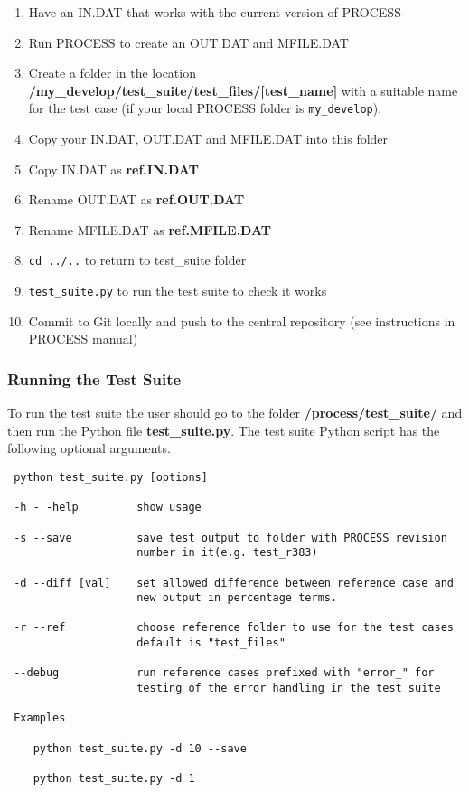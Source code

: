 \begin{enumerate}
  \item Have an IN.DAT that works with the current version of PROCESS
  \item Run PROCESS to create an OUT.DAT and MFILE.DAT
  \item Create a folder in the location \textbf{/my\_develop/test\_suite/test\_files/[test\_name]} with a suitable name for the test case (if your local PROCESS folder is \texttt{my\_develop}).
  \item Copy your IN.DAT, OUT.DAT and MFILE.DAT into this folder
  \item Copy IN.DAT as \textbf{ref.IN.DAT}
  \item Rename OUT.DAT as \textbf{ref.OUT.DAT}
  \item Rename MFILE.DAT as \textbf{ref.MFILE.DAT}
  \item \texttt{cd ../..}  to return to test\_suite folder
  \item \texttt{test\_suite.py}  to run the test suite to check it works
  \item Commit to Git locally and push to the central repository (see instructions in PROCESS manual)
\end{enumerate}

\subsubsection{Running the Test Suite}

To run the test suite the user should go to the folder \textbf{/process/test\_suite/} and then run the Python file \textbf{test\_suite.py}. The test suite Python script has the following optional arguments.\\
\begin{verbatim}
 python test_suite.py [options]

 -h - -help         show usage

 -s --save          save test output to folder with PROCESS revision
					number in it(e.g. test_r383)

 -d --diff [val]    set allowed difference between reference case and
					new output in percentage terms.

 -r --ref           choose reference folder to use for the test cases
                    default is "test_files"

 --debug            run reference cases prefixed with "error_" for
                    testing of the error handling in the test suite

 Examples

    python test_suite.py -d 10 --save

    python test_suite.py -d 1

\end{verbatim}


